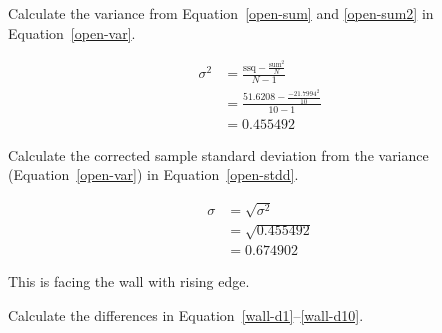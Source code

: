 \documentclass[twocolumn]{article}
\begin{document}
Calculate the variance from Equation~\ref{open-sum} and \ref{open-sum2} in Equation~\ref{open-var}.

\begin{align}
\sigma^{2} &= \frac{\text{ssq} - \frac{\text{sum}^{2}}{N}}{N-1} \nonumber\\
 &= \frac{51.6208 - \frac{-21.7994^2}{10}}{10-1} \nonumber\\
 &= 0.455492 \label{open-var}
\end{align}

Calculate the corrected sample standard deviation from the variance (Equation~\ref{open-var}) in Equation~\ref{open-stdd}.

\begin{align}
\sigma &= \sqrt{\sigma^{2}} \nonumber\\
 &= \sqrt{0.455492} \nonumber\\
 &= 0.674902 \label{open-stdd}
\end{align}

This is facing the wall with rising edge.

Calculate the differences in Equation~\ref{wall-d1}--\ref{wall-d10}.
\end{document}
